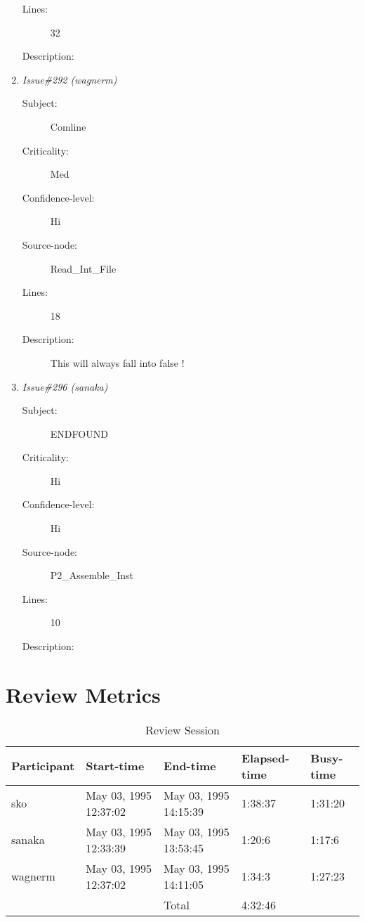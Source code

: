 \begin{enumerate}
\begin{description}
\item [Lines:] 32

\item [Description:] 
\end{description}
\item {\it Issue\#292 (wagnerm)}
\begin{description}
\item [Subject:] Comline
\item [Criticality:] Med
\item [Confidence-level:] Hi
\item [Source-node:] Read\_Int\_File

\item [Lines:] 18

\item [Description:] This will always fall into false !
\end{description}
\item {\it Issue\#296 (sanaka)}
\begin{description}
\item [Subject:] ENDFOUND
\item [Criticality:] Hi
\item [Confidence-level:] Hi
\item [Source-node:] P2\_Assemble\_Inst

\item [Lines:] 10

\item [Description:] 
\end{description}
\end{enumerate}
\section{Review Metrics}
\begin{table}[hb]
\begin{center}
\begin{tabular}{|l|l|l|l|l|}
\hline
Participant & Start-time & End-time & Elapsed-time & Busy-time \\
\hline
sko & May 03, 1995 12:37:02 & May 03, 1995 14:15:39 & 1:38:37 & 1:31:20 \\
sanaka & May 03, 1995 12:33:39 & May 03, 1995 13:53:45 & 1:20:6 & 1:17:6 \\
wagnerm & May 03, 1995 12:37:02 & May 03, 1995 14:11:05 & 1:34:3 & 1:27:23 \\
\hline
 & & Total & 4:32:46 & \\
\hline
\end{tabular}
\end{center}
\caption{Review Session}
\end{table}


